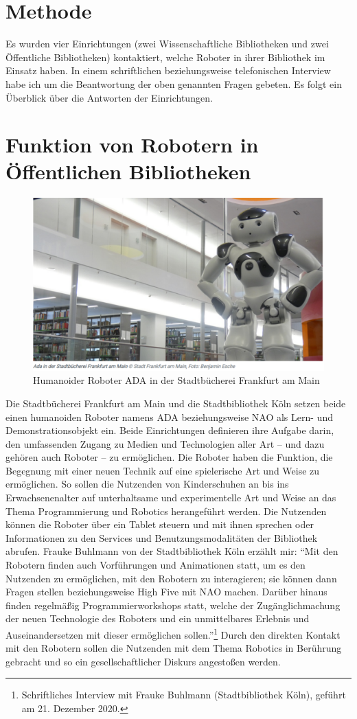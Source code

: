 \documentclass[a4paper,
fontsize=11pt,
oneside,
numbers=noperiodatend,
parskip=half-,
bibliography=totoc,
final
]{scrartcl}
\begin{document}
\hypertarget{methode}{%
\section{Methode}\label{methode}}

Es wurden vier Einrichtungen (zwei Wissenschaftliche Bibliotheken und
zwei Öffentliche Bibliotheken) kontaktiert, welche Roboter in ihrer
Bibliothek im Einsatz haben. In einem schriftlichen beziehungsweise
telefonischen Interview habe ich um die Beantwortung der oben genannten
Fragen gebeten. Es folgt ein Überblick über die Antworten der
Einrichtungen.

\hypertarget{funktion-von-robotern-in-uxf6ffentlichen-bibliotheken}{%
\section{Funktion von Robotern in Öffentlichen
Bibliotheken}\label{funktion-von-robotern-in-uxf6ffentlichen-bibliotheken}}

\begin{figure}
\centering
\includegraphics[width=.5\textwidth]{img/ADA.PNG}
\caption{Humanoider Roboter ADA in der Stadtbücherei Frankfurt am Main}
\end{figure}

Die Stadtbücherei Frankfurt am Main und die Stadtbibliothek Köln setzen
beide einen humanoiden Roboter namens ADA beziehungsweise NAO als Lern-
und Demonstrationsobjekt ein. Beide Einrichtungen definieren ihre
Aufgabe darin, den umfassenden Zugang zu Medien und Technologien aller
Art -- und dazu gehören auch Roboter -- zu ermöglichen. Die Roboter
haben die Funktion, die Begegnung mit einer neuen Technik auf eine
spielerische Art und Weise zu ermöglichen. So sollen die Nutzenden von
Kinderschuhen an bis ins Erwachsenenalter auf unterhaltsame und
experimentelle Art und Weise an das Thema Programmierung und Robotics
herangeführt werden. Die Nutzenden können die Roboter über ein Tablet
steuern und mit ihnen sprechen oder Informationen zu den Services und
Benutzungsmodalitäten der Bibliothek abrufen. Frauke Buhlmann von der
Stadtbibliothek Köln erzählt mir: \enquote{Mit den Robotern finden auch
Vorführungen und Animationen statt, um es den Nutzenden zu ermöglichen,
mit den Robotern zu interagieren; sie können dann Fragen stellen
beziehungsweise High Five mit NAO machen. Darüber hinaus finden
regelmäßig Programmierworkshops statt, welche der Zugänglichmachung der
neuen Technologie des Roboters und ein unmittelbares Erlebnis und
Auseinandersetzen mit dieser ermöglichen sollen.}\footnote{Schriftliches
  Interview mit Frauke Buhlmann (Stadtbibliothek Köln), geführt am 21.
  Dezember 2020.} Durch den direkten Kontakt mit den Robotern sollen die
Nutzenden mit dem Thema Robotics in Berührung gebracht und so ein
gesellschaftlicher Diskurs angestoßen werden.
\end{document}
